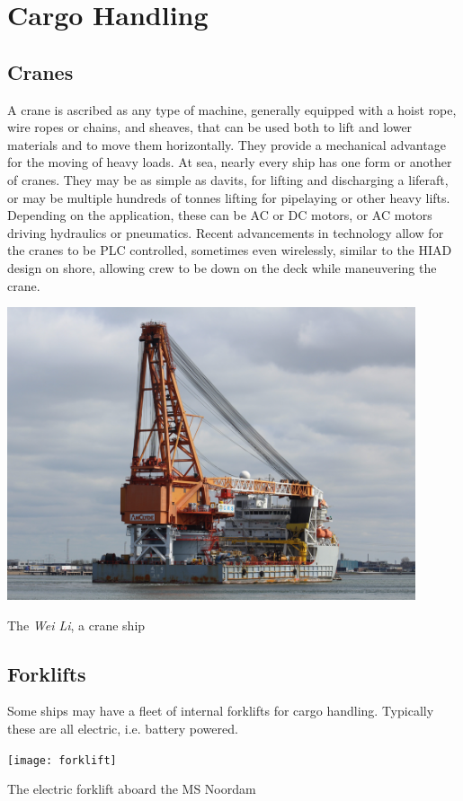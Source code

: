 \documentclass[11pt,a4paper]{article}
\begin{document}
\section{Cargo Handling}
\subsection{Cranes}
A crane is ascribed as any type of machine, generally equipped with a hoist rope, wire ropes or chains, and sheaves, that can be used both to lift and lower materials and to move them horizontally. They provide a mechanical advantage for the moving of heavy loads. At sea, nearly every ship has one form or another of cranes. They may be as simple as davits, for lifting and discharging a liferaft, or may be multiple hundreds of tonnes lifting for pipelaying or other heavy lifts. Depending on the application, these can be AC or DC motors, or AC motors driving hydraulics or pneumatics. Recent advancements in technology allow for the cranes to be PLC controlled, sometimes even wirelessly, similar to the HIAD design on shore, allowing crew to be down on the deck while maneuvering the crane.
\begin{center}
\includegraphics[width=12cm]{crane}\par
The \textit{Wei Li}, a crane ship
\end{center}
\subsection{Forklifts}
Some ships may have a fleet of internal forklifts for cargo handling. Typically these are all electric, i.e. battery powered.
\begin{center}
\texttt{[image: forklift]}\par
The electric forklift aboard the MS Noordam
\end{center}
\end{document}
